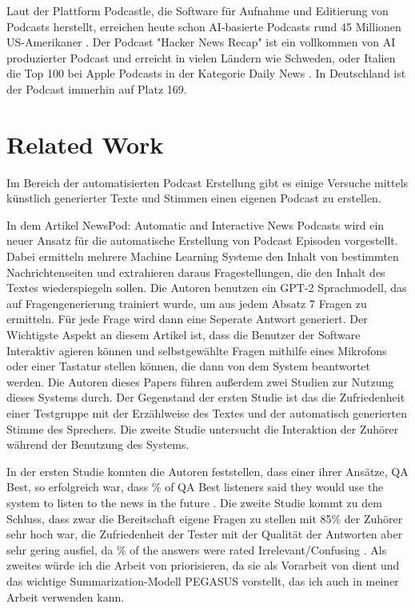 Laut der Plattform Podcastle, die Software für Aufnahme und Editierung von Podcasts herstellt, 
erreichen heute schon AI-basierte Podcasts rund 45 Millionen US-Amerikaner \cite{podcastle2023}.
Der Podcast "Hacker News Recap" ist ein vollkommen von AI produzierter Podcast und erreicht in vielen Ländern wie Schweden, oder Italien die Top 100 bei Apple Podcasts in der Kategorie Daily News \cite{chartable}.
In Deutschland ist der Podcast immerhin auf Platz 169.

\section{Related Work}

Im Bereich der automatisierten Podcast Erstellung gibt es einige Versuche mittels künstlich generierter Texte und Stimmen einen eigenen Podcast zu erstellen.

In dem Artikel \glqq NewsPod: Automatic and Interactive News Podcasts\grqq{} \cite{laban2022} wird ein neuer Ansatz für die automatische Erstellung von Podcast Episoden vorgestellt. 
Dabei ermitteln mehrere Machine Learning Systeme den Inhalt von bestimmten Nachrichtenseiten und extrahieren daraus Fragestellungen, die den Inhalt des Textes wiederspiegeln sollen. Die Autoren benutzen ein GPT-2 Sprachmodell, das auf Fragengenerierung trainiert wurde, um aus jedem Absatz 7 Fragen zu ermitteln. 
Für jede Frage wird dann eine Seperate Antwort generiert. 
Der Wichtigste Aspekt an diesem Artikel ist, dass die Benutzer der Software Interaktiv agieren können und selbstgewählte Fragen mithilfe eines Mikrofons oder einer Tastatur stellen können, die dann von dem System beantwortet werden. 
Die Autoren dieses Papers führen außerdem zwei Studien zur Nutzung dieses Systems durch.
Der Gegenstand der ersten Studie ist das die Zufriedenheit einer Testgruppe mit der Erzählweise des Textes und der automatisch generierten Stimme des Sprechers. 
Die zweite Studie untersucht die Interaktion der Zuhörer während der Benutzung des Systems. 
\cite{laban2022}

In der ersten Studie konnten die Autoren feststellen, dass einer ihrer Ansätze, QA Best,  so erfolgreich war, dass \% of QA Best listeners said they would use the system to listen to the news in the future\grqq{}  \cite{laban2022}.
Die zweite Studie kommt zu dem Schluss, dass zwar die Bereitschaft eigene Fragen zu stellen mit 85\% der Zuhörer sehr hoch war, die Zufriedenheit der Tester mit der Qualität der Antworten aber sehr gering ausfiel, da \% of the answers were rated Irrelevant/Confusing\grqq{} \cite{laban2022}.
Als zweites würde ich die Arbeit von \cite{zhang2020} priorisieren, da sie als Vorarbeit von \cite{laban2022} dient und das wichtige Summarization-Modell PEGASUS vorstellt, das ich auch in meiner Arbeit verwenden kann.





